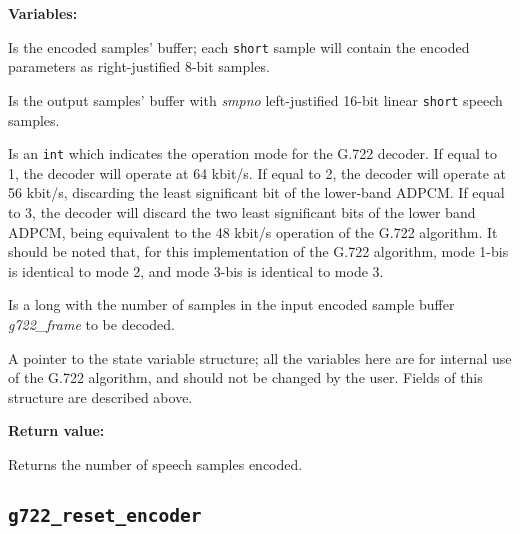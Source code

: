 {\bf Variables: }
\begin{Descr}{\DescrLen}
\item[\pbox{20mm}{\em g722\_frame}] %
               Is the encoded samples' buffer; each {\tt short} sample
               will contain the encoded parameters as right-justified
               8-bit samples.

\item[\pbox{20mm}{\em out\_buf}] %
               Is the output samples' buffer with {\em smpno}
               left-justified 16-bit linear {\tt short} speech samples.

\item[\pbox{20mm}{\em mode}] %
               Is an {\tt int} which indicates the operation mode for the
               G.722 decoder. If equal to 1, the decoder will operate at
               64 kbit/s. If equal to 2, the decoder will operate at
               56 kbit/s, discarding the least significant bit of the
               lower-band ADPCM. If equal to 3, the decoder will
               discard the two least significant bits of the lower
               band ADPCM, being equivalent to the 48 kbit/s operation of
               the G.722 algorithm. It should be noted that, for this
               implementation of the G.722 algorithm, mode 1-bis is
               identical to mode 2, and mode 3-bis is identical to mode 3.

\item[\pbox{20mm}{\em smpno}] %
               Is a long with the number of samples in the input
               encoded sample buffer {\em g722\_frame} to be decoded.

\item[\pbox{20mm}{\em g722\_decoder}] %
               A pointer to the state variable structure; all the variables
               here are for
               internal use of the G.722 algorithm, and should not be
               changed by the user. Fields of this structure are described
               above.
\end{Descr}

        {\bf Return value: }

Returns the number of speech samples encoded.


\newpage
\subsection{{\tt g722\_reset\_encoder}}

